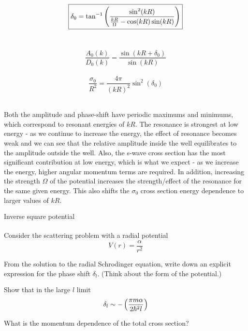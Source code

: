\documentclass[10pt,letterpaper]{article}
\begin{document}
	\item
	\[
		\boxed{
		\delta_0 = \tan^{-1} \left(\frac{\sin^2(kR)}{\frac{kR}{\Omega}-\cos(kR)\sin(kR)}\right)
		}
	\]
	\\
	\phantom{} \phantom{} \phantom{} \phantom{} \phantom{} \phantom{} \phantom{} \phantom{} \phantom{} 
	\phantom{} \phantom{} \phantom{} \phantom{} 
	
	
	\[
		\boxed{
		\frac{A_0(k)}{D_0(k)} =  \frac{\sin(kR+\delta_0)}{\sin(kR)}
		}
	\]
	\\
	\phantom{} \phantom{} \phantom{} \phantom{} \phantom{} \phantom{} \phantom{} \phantom{} \phantom{} 
	\phantom{} \phantom{} \phantom{} \phantom{} 
	\[
		\boxed{
		\frac{\sigma_0}{R^2}  = \frac{4\pi}{(kR)^2} \sin^2(\delta_0)
		}
	\]
	\\
	
	\item
	Both the amplitude and phase-shift have periodic maximums and minimums, which correspond to resonant 
	energies of $kR$. The resonance is strongest at low energy - as we continue to increase the energy, the effect of 
	resonance becomes weak and we can see that the relative amplitude inside the well equilibrates to the amplitude 
	outside the well. Also, the s-wave cross section has the most significant contribution at low energy, which is what we 
	expect - as we increase the energy, higher angular momentum terms are required. In addition, increasing the 
	strength $\Omega$ of the potential increases the strength/effect of the resonance for the same given energy.
	This also shifts the $\sigma_0$ cross section energy dependence to larger values of $kR$.  
	\\
	\eenum
	\item{Inverse square potential}
	\\ \\
	Consider the scattering problem with a radial potential
	\[
		V(r) = \frac{\alpha}{r^2}
	\]
	\benum
	\item 
	From the solution to the radial Schrodinger equation, write down an explicit expression for the phase shift 
	$\delta_l$. (Think about the form of the potential.)
	\item
	Show that in the large $l$ limit
	\[
		\delta_l \sim -\left(\frac{\pi m \alpha}{2\hbar^2l}\right)
	\]
	\item
	What is the momentum dependence of the total cross section?
	\\ \\ 
	\eenum
	
\end{document}
